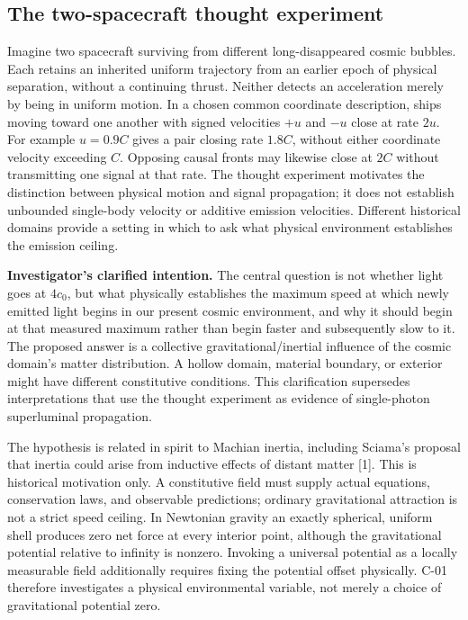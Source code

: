 \documentclass[
  11pt,
  twoside]{article}
\begin{document}
\subsection{The two-spacecraft thought
experiment}\label{the-two-spacecraft-thought-experiment}

Imagine two spacecraft surviving from different long-disappeared cosmic
bubbles. Each retains an inherited uniform trajectory from an earlier
epoch of physical separation, without a continuing thrust. Neither
detects an acceleration merely by being in uniform motion. In a chosen
common coordinate description, ships moving toward one another with
signed velocities \(+u\) and \(-u\) close at rate \(2u\). For example
\(u=0.9C\) gives a pair closing rate \(1.8C\), without either coordinate
velocity exceeding \(C\). Opposing causal fronts may likewise close at
\(2C\) without transmitting one signal at that rate. The thought
experiment motivates the distinction between physical motion and signal
propagation; it does not establish unbounded single-body velocity or
additive emission velocities. Different historical domains provide a
setting in which to ask what physical environment establishes the
emission ceiling.

\textbf{Investigator's clarified intention.} The central question is not
whether light goes at \(4c_0\), but what physically establishes the
maximum speed at which newly emitted light begins in our present cosmic
environment, and why it should begin at that measured maximum rather
than begin faster and subsequently slow to it. The proposed answer is a
collective gravitational/inertial influence of the cosmic domain's
matter distribution. A hollow domain, material boundary, or exterior
might have different constitutive conditions. This clarification
supersedes interpretations that use the thought experiment as evidence
of single-photon superluminal propagation.

The hypothesis is related in spirit to Machian inertia, including
Sciama's proposal that inertia could arise from inductive effects of
distant matter {[}1{]}. This is historical motivation only. A
constitutive field must supply actual equations, conservation laws, and
observable predictions; ordinary gravitational attraction is not a
strict speed ceiling. In Newtonian gravity an exactly spherical, uniform
shell produces zero net force at every interior point, although the
gravitational potential relative to infinity is nonzero. Invoking a
universal potential as a locally measurable field additionally requires
fixing the potential offset physically. C-01 therefore investigates a
physical environmental variable, not merely a choice of gravitational
potential zero.
\end{document}
